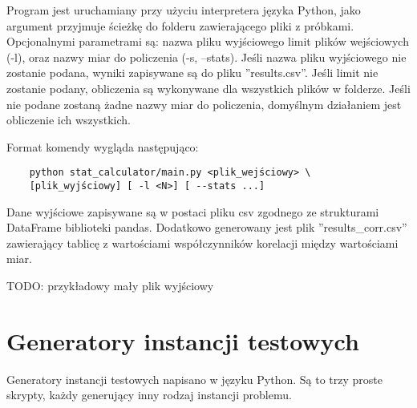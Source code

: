 Program jest uruchamiany przy użyciu interpretera języka Python, jako argument przyjmuje
ścieżkę do folderu zawierającego pliki z próbkami. Opcjonalnymi parametrami są: nazwa pliku wyjściowego
limit plików wejściowych (-l), oraz nazwy miar do policzenia (-s, --stats). Jeśli nazwa pliku wyjściowego nie zostanie podana, wyniki zapisywane
są do pliku ''results.csv''. Jeśli limit nie zostanie podany, obliczenia są wykonywane dla wszystkich plików w folderze.
Jeśli nie podane zostaną żadne nazwy miar do policzenia, domyślnym działaniem jest obliczenie ich wszystkich.

Format komendy wygląda następująco:
\begin{lstlisting}
    python stat_calculator/main.py <plik_wejściowy> \
    [plik_wyjściowy] [ -l <N>] [ --stats ...]
\end{lstlisting}

Dane wyjściowe zapisywane są w postaci pliku csv zgodnego ze strukturami DataFrame biblioteki pandas.
Dodatkowo generowany jest plik ''results\_corr.csv'' zawierający tablicę z wartościami współczynników korelacji
między wartościami miar.

TODO: przykładowy mały plik wyjściowy

\section{Generatory instancji testowych}

Generatory instancji testowych napisano w języku Python.
Są to trzy proste skrypty, każdy generujący inny rodzaj instancji problemu.

